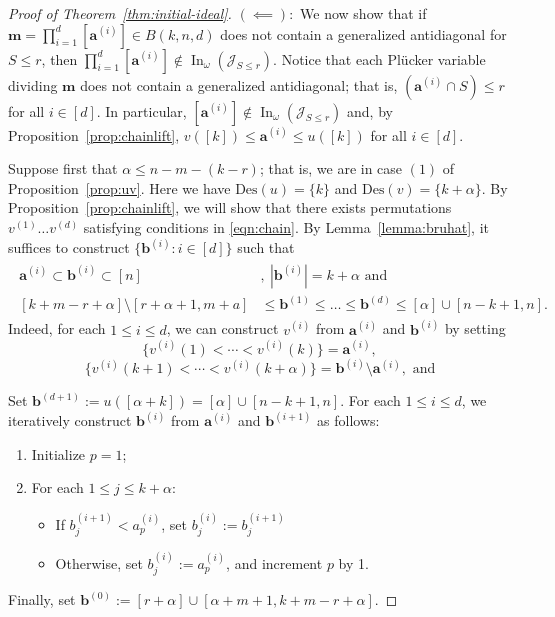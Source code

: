 \documentclass[12pt,reqno]{amsart}
\theoremstyle{definition}
\newcommand{\inn}{\operatorname{In}}
\renewcommand{\aa}{\mathbf a}
\newcommand{\bb}{\mathbf b}
\newcommand{\mm}{\mathbf m}
\newcommand{\cJ}{\mathcal{J}}
\begin{document}
{\begin{proof}[Proof of Theorem~\ref{thm:initial-ideal}]
    \noindent $(\impliedby):$ We now show that if $\mm = \prod_{i = 1}^d [\mathbf{a}^{(i)}]\in B(k,n,d)$ does not contain a generalized antidiagonal for $S\leq r$, then  $\prod_{i = 1}^d [\mathbf{a}^{(i)}]\notin \inn_\omega (\cJ_{S\le r})$. 
    Notice that each Pl\"{u}cker variable dividing $\mm$ does not contain a generalized antidiagonal; that is, $(\aa^{(i)}\cap S) \leq r$  for all $i\in [d]$.
    In particular, $[\aa^{(i)}]\notin \inn_\omega(\cJ_{S\le r})$ and, by Proposition~\ref{prop:chainlift}, 
    $v([k])\leq \aa^{(i)}\leq u([k])$ for all $i\in [d]$.
     
     Suppose first that $\alpha\le n-m-(k-r)$; that is, we are in case $(1)$ of Proposition~\ref{prop:uv}. Here we have $\mathrm{Des}(u) = \{k\}$ and $\mathrm{Des}(v) = \{k+\alpha\}$.
    By Proposition~\ref{prop:chainlift}, we will show that there exists permutations $v^{(1)}\dots v^{(d)}$ satisfying conditions in \eqref{eqn:chain}. 
    By Lemma~\ref{lemma:bruhat}, it suffices to construct $\{\mathbf{b}^{(i)}:i\in [d]\}$ such that
    \begin{align}\label{eqn:defb}
    \begin{split}
        \mathbf{a}^{(i)}\subset \mathbf{b}^{(i)} \subset [n]&,\  |\mathbf{b}^{(i)}| = k+\alpha\text{ and }\\
        [k+m-r+\alpha]\setminus[r+\alpha+1,m+a] &\leq \mathbf{b}^{(1)} \leq \dots \leq \mathbf{b}^{(d)} \leq [\alpha]\cup[n-k+1,n].
     \end{split}
    \end{align}
    Indeed, for each $1\le i\le d$, we can construct $v^{(i)}$ from $\aa^{(i)}$ and $\bb^{(i)}$ by setting 
    \[\{v^{(i)}(1)<\cdots < v^{(i)}(k)\}=\aa^{(i)},\]
     \[\{v^{(i)}(k+1)<\cdots<v^{(i)}(k+\alpha)\}=\bb^{(i)}\setminus\aa^{(i)},\text{ and}\]

    Set $\bb^{(d+1)}:= u([\alpha+k]) = [\alpha]\cup[n-k+1,n]$. For each $1\le i\le d$, we iteratively construct $\bb^{(i)}$ from $\aa^{(i)}$ and $\bb^{(i+1)}$ as follows:
    \begin{enumerate}
        \item Initialize $p=1$;
        \item For each $1\le j \le k+\alpha$:
        \begin{itemize}
            \item[-] If $b_j^{(i+1)} < a_p^{(i)}$, set $b_j^{(i)}:=b_{j}^{(i+1)}$
            \item[-] Otherwise, set $b_{j}^{(i)}:=a^{(i)}_p$, and increment $p$ by 1.
        \end{itemize}
    \end{enumerate}
    Finally, set $\bb^{(0)}:=[r+\alpha]\cup [\alpha+m+1,k+m-r+\alpha]$.



\end{proof}}
\end{document}
